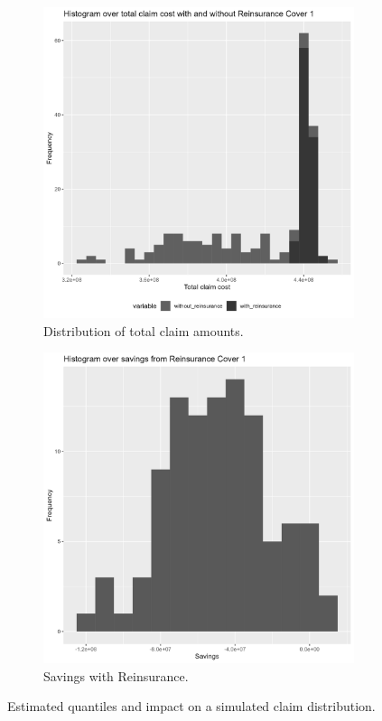 \documentclass[11pt]{article}
\begin{document}
 \begin{figure}[!h]
\centering
    \begin{subfigure}{.49\textwidth}
      \centering
      \includegraphics[width=.9\linewidth]{plots/reinsurance1/histogram_total_claim_cost_with_reinsurance.png}
      \caption{Distribution of total claim amounts.}
    \end{subfigure}
    \begin{subfigure}{.49\textwidth}
      \centering
      \includegraphics[width=.9\linewidth]{plots/reinsurance1/histogram_savings.png}
      \caption{Savings with Reinsurance.}
    \end{subfigure}
    \caption{Estimated quantiles and impact on a simulated claim distribution.}
    \label{a5:claim_cost}
\end{figure}
\end{document}
